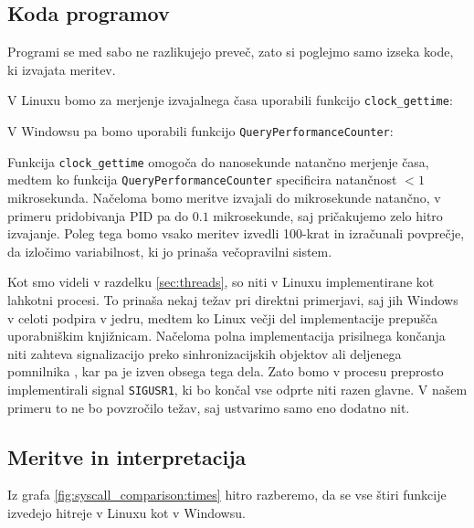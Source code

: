 \documentclass[a4paper,12pt,openright]{book}
\begin{document}
\subsection{Koda programov}

Programi se med sabo ne razlikujejo preveč, zato si poglejmo samo izseka kode, ki izvajata meritev.

V Linuxu bomo za merjenje izvajalnega časa uporabili funkcijo \texttt{clock\_gettime}:


V Windowsu pa bomo uporabili funkcijo \texttt{QueryPerformanceCounter}:


Funkcija \texttt{clock\_gettime} omogoča do nanosekunde natančno merjenje časa, medtem ko funkcija \texttt{QueryPerformanceCounter} specificira natančnost $< 1$ mikrosekunda.
Načeloma bomo meritve izvajali do mikrosekunde natančno, v primeru pridobivanja PID pa do $0.1$ mikrosekunde, saj pričakujemo zelo hitro izvajanje.
Poleg tega bomo vsako meritev izvedli 100-krat in izračunali povprečje, da izločimo variabilnost, ki jo prinaša večopravilni sistem.

Kot smo videli v razdelku \ref{sec:threads}, so niti v Linuxu implementirane kot lahkotni procesi.
To prinaša nekaj težav pri direktni primerjavi, saj jih Windows v celoti podpira v jedru, medtem ko Linux večji del implementacije prepušča uporabniškim knjižnicam.
Načeloma polna implementacija prisilnega končanja niti zahteva signalizacijo preko sinhronizacijskih objektov ali deljenega pomnilnika \cite{Mueller_1993}, kar pa je izven obsega tega dela.
Zato bomo v procesu preprosto implementirali signal \texttt{SIGUSR1}, ki bo končal vse odprte niti razen glavne.
V našem primeru to ne bo povzročilo težav, saj ustvarimo samo eno dodatno nit.

\subsection{Meritve in interpretacija}

Iz grafa \ref{fig:syscall_comparison:times} hitro razberemo, da se vse štiri funkcije izvedejo hitreje v Linuxu kot v Windowsu.
\end{document}
